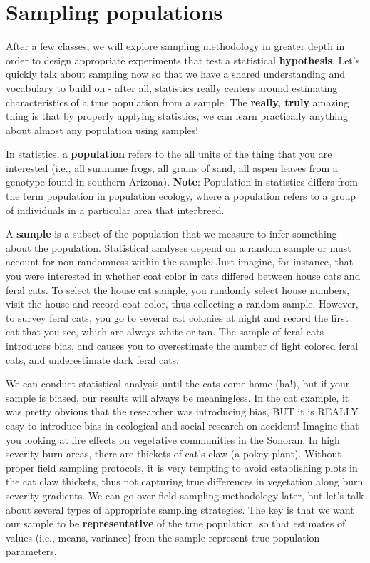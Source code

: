 \documentclass[
]{book}
\begin{document}
\hypertarget{sampling-populations}{%
\section{Sampling populations}\label{sampling-populations}}

After a few classes, we will explore sampling methodology in greater depth in order to design appropriate experiments that test a statistical \textbf{hypothesis}. Let's quickly talk about sampling now so that we have a shared understanding and vocabulary to build on - after all, statistics really centers around estimating characteristics of a true population from a sample. The \textbf{really, truly} amazing thing is that by properly applying statistics, we can learn practically anything about almost any population using samples!

In statistics, a \textbf{population} refers to the all units of the thing that you are interested (i.e., all suriname frogs, all grains of sand, all aspen leaves from a genotype found in southern Arizona). \textbf{Note}: Population in statistics differs from the term population in population ecology, where a population refers to a group of individuals in a particular area that interbreed.

A \textbf{sample} is a subset of the population that we measure to infer something about the population. Statistical analyses depend on a random sample or must account for non-randomness within the sample. Just imagine, for instance, that you were interested in whether coat color in cats differed between house cats and feral cats. To select the house cat sample, you randomly select house numbers, visit the house and record coat color, thus collecting a random sample. However, to survey feral cats, you go to several cat colonies at night and record the first cat that you see, which are always white or tan. The sample of feral cats introduces bias, and causes you to overestimate the number of light colored feral cats, and underestimate dark feral cats.

We can conduct statistical analysis until the cats come home (ha!), but if your sample is biased, our results will always be meaningless. In the cat example, it was pretty obvious that the researcher was introducing bias, BUT it is REALLY easy to introduce bias in ecological and social research on accident! Imagine that you looking at fire effects on vegetative communities in the Sonoran. In high severity burn areas, there are thickets of cat's claw (a pokey plant). Without proper field sampling protocols, it is very tempting to avoid establishing plots in the cat claw thickets, thus not capturing true differences in vegetation along burn severity gradients. We can go over field sampling methodology later, but let's talk about several types of appropriate sampling strategies. The key is that we want our sample to be \textbf{representative} of the true population, so that estimates of values (i.e., means, variance) from the sample represent true population parameters.
\end{document}
